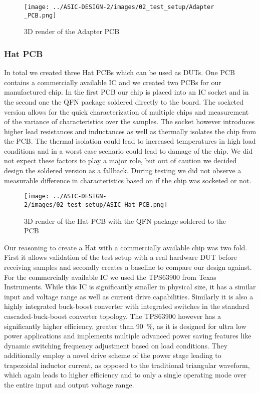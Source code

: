 \begin{figure}[h]
    \centering
    \texttt{[image: ../ASIC-DESIGN-2/images/02\_test\_setup/Adapter \_PCB.png]}
    \caption{3D render of the Adapter PCB}
    \label{fig:Adapter_PCB}
\end{figure}



\subsubsection{Hat PCB}
In total we created three Hat PCBs which can be used as \ac{DUT}s. One PCB contains a commercially available IC and we created two PCBs for our manufactured chip. In the first PCB our chip is placed into an \ac{IC} socket and in the second one the QFN package soldered directly to the board. The socketed version allows for the quick characterization of multiple chips and measurement of the variance of characteristics over the samples. The socket however introduces higher lead resistances and inductances as well as thermally isolates the chip from the PCB. The thermal isolation could lead to increased temperatures in high load conditions and in a worst case scenario could lead to damage of the chip. We did not expect these factors to play a major role, but out of caution we decided design the soldered version as a fallback. During testing we did not observe a measurable difference in characteristics based on if the chip was socketed or not.\\


\begin{figure}[h]
    \centering
    \texttt{[image: ../ASIC-DESIGN-2/images/02\_test\_setup/ASIC\_Hat\_PCB.png]}
    \caption{3D render of the Hat PCB with the QFN package soldered to the PCB}
    \label{fig:ASIC_Hat}
\end{figure}


Our reasoning to create a Hat with a commercially available chip was two fold. First it allows validation of the test setup with a real hardware \ac{DUT} before receiving samples and secondly creates a baseline to compare our design against. For the commercially available \ac{IC} we used the TPS63900 from Texas Instruments. While this \ac{IC} is significantly smaller in physical size, it has a similar input and voltage range as well as current drive capabilities. Similarly it is also a highly integrated buck-boost converter with integrated switches in the standard cascaded-buck-boost converter topology. The TPS63900 however has a significantly higher efficiency, greater than \qty{90}{\percent}\cite{tps63900}, as it is designed for ultra low power applications and implements multiple advanced power saving features like dynamic switching frequency adjustment based on load conditions\cite{tps63900}. They additionally employ a novel drive scheme of the power stage leading to trapezoidal inductor current, as opposed to the traditional triangular waveform, which again leads to higher efficiency and to only a single operating mode over the entire input and output voltage range\cite{tps63900}. 